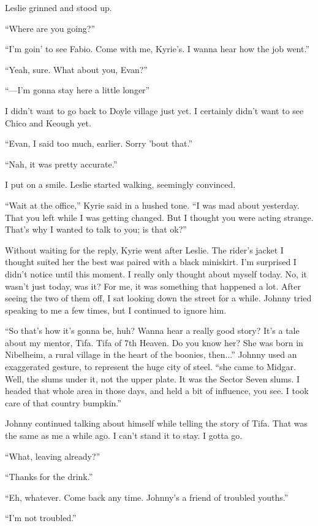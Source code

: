 \documentclass[oneside]{book}
\begin{document}
Leslie grinned and stood up.

“Where are you going?”

“I’m goin’ to see Fabio. Come with me, Kyrie’s. I wanna hear how the job went.”

“Yeah, sure. What about you, Evan?”

“—I’m gonna stay here a little longer”

I didn’t want to go back to Doyle village just yet. I certainly didn’t want to see Chico and Keough yet.

“Evan, I said too much, earlier. Sorry ’bout that.”

“Nah, it was pretty accurate.”

I put on a smile. Leslie started walking, seemingly convinced.

“Wait at the office,” Kyrie said in a hushed tone. “I was mad about yesterday. That you left while I was getting changed. But I thought you were acting strange. That’s why I wanted to talk to you; is that ok?”

Without waiting for the reply, Kyrie went after Leslie. The rider’s jacket I thought suited her the best was paired with a black miniskirt. I’m surprised I didn’t notice until this moment. I really only thought about myself today. No, it wasn’t just today, was it? For me, it was something that happened a lot. After seeing the two of them off, I sat looking down the street for a while. Johnny tried speaking to me a few times, but I continued to ignore him.

“So that’s how it’s gonna be, huh? Wanna hear a really good story? It’s a tale about my mentor, Tifa. Tifa of 7th Heaven. Do you know her? She was born in Nibelheim, a rural village in the heart of the boonies, then...” Johnny used an exaggerated gesture, to represent the huge city of steel. “she came to Midgar. Well, the slums under it, not the upper plate. It was the Sector Seven slums. I headed that whole area in those days, and held a bit of influence, you see. I took care of that country bumpkin.”

Johnny continued talking about himself while telling the story of Tifa. That was the same as me a while ago. I can’t stand it to stay. I gotta go.

“What, leaving already?”

“Thanks for the drink.”

“Eh, whatever. Come back any time. Johnny’s a friend of troubled youths.”

“I’m not troubled.”
\end{document}
